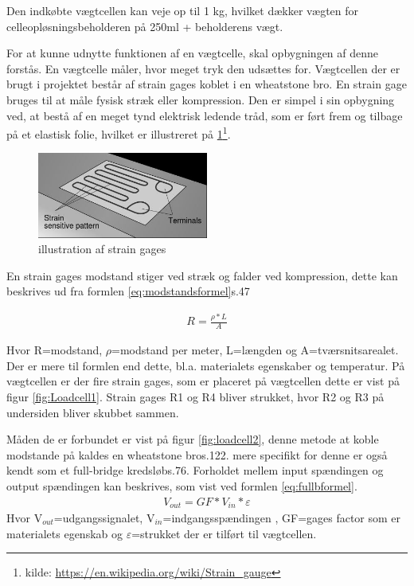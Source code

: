 Den indkøbte vægtcellen kan veje op til 1 kg, hvilket dækker vægten for celleopløsningsbeholderen på 250ml + beholderens vægt.

 For at kunne udnytte funktionen af en vægtcelle, skal opbygningen af denne forstås. En vægtcelle måler, hvor meget tryk den udsættes for. Vægtcellen der er brugt i projektet består af strain gages koblet i en wheatstone bro. En strain gage bruges til at måle fysisk stræk eller kompression. Den er simpel i sin opbygning ved, at bestå af en meget tynd elektrisk ledende tråd, som er ført frem og tilbage på et elastisk folie, hvilket er illustreret på \ref{fig:Strain gages}\footnote{kilde: \url{https://en.wikipedia.org/wiki/Strain_gauge}}. 
 
 \begin{figure}[H]
	\centering
	\includegraphics[width=0.5\textwidth]{billeder/Hardware/straingages1.JPG}
	\caption{illustration af strain gages}
	\label{fig:Strain gages}
\end{figure}

En strain gages modstand stiger ved stræk og falder ved kompression, dette kan beskrives ud fra formlen \ref{eq:modstandsformel}\citep{Websterbog}{s.47}

 \begin{align}
 R=\frac{\rho*L}{A}
 \label{eq:modstandsformel}
 \end{align}
 
 Hvor R=modstand, $\rho$=modstand per meter, L=længden og A=tværsnitsarealet. Der er mere til formlen end dette, bl.a. materialets egenskaber og temperatur. På vægtcellen er der fire strain gages, som er placeret på vægtcellen dette er vist på figur \ref{fig:Loadcell1}. Strain gages R1 og R4 bliver strukket, hvor R2 og R3 på undersiden bliver skubbet sammen.
 
 Måden de er forbundet er vist på figur \ref{fig:loadcell2}, denne metode at koble modstande på kaldes en wheatstone bro\citep{ELengbog}{s.122}. mere specifikt for denne er også kendt som et full-bridge kredsløb\citep{AETbog}{s.76}. Forholdet mellem input spændingen og output spændingen kan beskrives, som vist ved formlen \ref{eq:fullbformel}.
\begin{align}
 V_{out}=GF*V_{in}*\varepsilon
 \label{eq:fullbformel}
 \end{align}
 Hvor V$_{out}$=udgangssignalet, V$_{in}$=indgangsspændingen , GF=gages factor som er materialets egenskab og $\varepsilon$=strukket der er tilført til vægtcellen.

